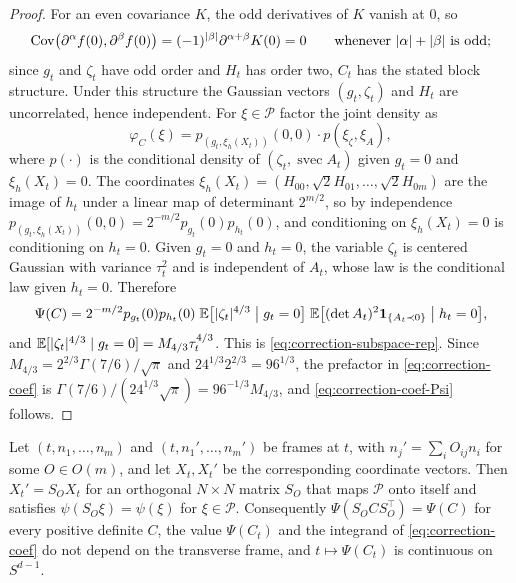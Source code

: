 \begin{proof}
For an even covariance $K$, the odd derivatives of $K$ vanish at $0$, so
\[
\operatorname{Cov}\bigl(\partial^\alpha f(0),\partial^\beta f(0)\bigr)=(-1)^{|\beta|}\partial^{\alpha+\beta}K(0)=0\qquad\text{whenever $|\alpha|+|\beta|$ is odd;}
\]
since $g_t$ and $\zeta_t$ have odd order and $H_t$ has order two, $C_t$ has the stated block structure. Under this structure the Gaussian vectors $(g_t,\zeta_t)$ and $H_t$ are uncorrelated, hence independent. For $\xi\in\mathcal P$ factor the joint density as
\[
\varphi_{C}(\xi)=p_{(g_t,\xi_h(X_t))}(0,0)\cdot p(\xi_\zeta,\xi_A),
\]
where $p(\cdot)$ is the conditional density of $(\zeta_t,\operatorname{svec}A_t)$ given $g_t=0$ and $\xi_h(X_t)=0$. The coordinates $\xi_h(X_t)=(H_{00},\sqrt2H_{01},\dots,\sqrt2H_{0m})$ are the image of $h_t$ under a linear map of determinant $2^{m/2}$, so by independence $p_{(g_t,\xi_h(X_t))}(0,0)=2^{-m/2}p_{g_t}(0)p_{h_t}(0)$, and conditioning on $\xi_h(X_t)=0$ is conditioning on $h_t=0$. Given $g_t=0$ and $h_t=0$, the variable $\zeta_t$ is centered Gaussian with variance $\tau_t^2$ and is independent of $A_t$, whose law is the conditional law given $h_t=0$. Therefore
\[
\Psi(C)=2^{-m/2}p_{g_t}(0)p_{h_t}(0)\;\mathbb E\bigl[|\zeta_t|^{4/3}\bigm| g_t=0\bigr]\;\mathbb E\bigl[(\det A_t)^2\mathbf 1_{\{A_t\prec0\}}\bigm| h_t=0\bigr],
\]
and $\mathbb E[|\zeta_t|^{4/3}\mid g_t=0]=M_{4/3}\tau_t^{4/3}$. This is \eqref{eq:correction-subspace-rep}. Since $M_{4/3}=2^{2/3}\Gamma(7/6)/\sqrt\pi$ and $24^{1/3}2^{2/3}=96^{1/3}$, the prefactor in \eqref{eq:correction-coef} is $\Gamma(7/6)/(24^{1/3}\sqrt\pi)=96^{-1/3}M_{4/3}$, and \eqref{eq:correction-coef-Psi} follows.
\end{proof}

\begin{lemma}\label{lem:correction-frame}
Let $(t,n_1,\dots,n_m)$ and $(t,n_1',\dots,n_m')$ be frames at $t$, with $n_j'=\sum_iO_{ij}n_i$ for some $O\in O(m)$, and let $X_t,X_t'$ be the corresponding coordinate vectors. Then $X_t'=S_OX_t$ for an orthogonal $N\times N$ matrix $S_O$ that maps $\mathcal P$ onto itself and satisfies $\psi(S_O\xi)=\psi(\xi)$ for $\xi\in\mathcal P$. Consequently $\Psi(S_OCS_O^{\top})=\Psi(C)$ for every positive definite $C$, the value $\Psi(C_t)$ and the integrand of \eqref{eq:correction-coef} do not depend on the transverse frame, and $t\mapsto\Psi(C_t)$ is continuous on $S^{d-1}$.
\end{lemma}

